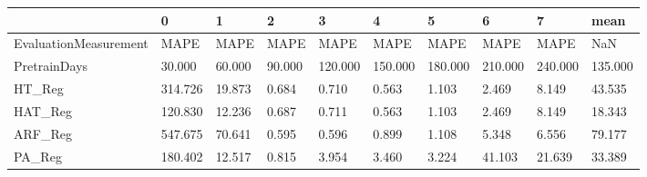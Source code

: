 \begin{tabular}{llllllllll}
\toprule
{} &       0 &      1 &      2 &       3 &       4 &       5 &       6 &       7 &    mean \\
\midrule
EvaluationMeasurement &    MAPE &   MAPE &   MAPE &    MAPE &    MAPE &    MAPE &    MAPE &    MAPE &     NaN \\
PretrainDays          &  30.000 & 60.000 & 90.000 & 120.000 & 150.000 & 180.000 & 210.000 & 240.000 & 135.000 \\
HT\_Reg                & 314.726 & 19.873 &  0.684 &   0.710 &   0.563 &   1.103 &   2.469 &   8.149 &  43.535 \\
HAT\_Reg               & 120.830 & 12.236 &  0.687 &   0.711 &   0.563 &   1.103 &   2.469 &   8.149 &  18.343 \\
ARF\_Reg               & 547.675 & 70.641 &  0.595 &   0.596 &   0.899 &   1.108 &   5.348 &   6.556 &  79.177 \\
PA\_Reg                & 180.402 & 12.517 &  0.815 &   3.954 &   3.460 &   3.224 &  41.103 &  21.639 &  33.389 \\
\bottomrule
\end{tabular}
